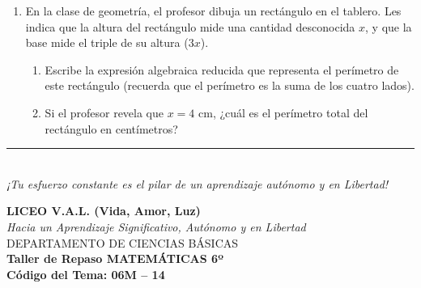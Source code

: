\documentclass[12pt, letterpaper]{article}
\begin{document}
\begin{enumerate}[itemsep=0.8cm]
		\item En la clase de geometría, el profesor dibuja un rectángulo en el tablero. Les indica que la altura del rectángulo mide una cantidad desconocida $x$, y que la base mide el triple de su altura ($3x$).
		\begin{enumerate}[label=\alph*., itemsep=0.2cm, topsep=0.2cm]
			\item Escribe la expresión algebraica reducida que representa el perímetro de este rectángulo (recuerda que el perímetro es la suma de los cuatro lados).
			\item Si el profesor revela que $x = 4\text{ cm}$, ¿cuál es el perímetro total del rectángulo en centímetros?
		\end{enumerate}
		
	\end{enumerate}
	
	\vfill
	\begin{center}
		\rule{0.5\textwidth}{0.4pt} \\
		\vspace{0.2cm}
		\textit{¡Tu esfuerzo constante es el pilar de un aprendizaje autónomo y en Libertad!}
	\end{center}
	
	\newpage
	\begin{center}
		{\Large \textbf{LICEO V.A.L. (Vida, Amor, Luz)}}\\[0.1cm]
		{\normalsize \textit{Hacia un Aprendizaje Significativo, Autónomo y en Libertad}}\\[0.2cm]
		{\large DEPARTAMENTO DE CIENCIAS BÁSICAS}\\[0.1cm]
		\textbf{Taller de Repaso MATEMÁTICAS 6º}\\[0.1cm]
		\textbf{Código del Tema: 06M – 14}\\[0.1cm]
	\end{center}
	
\end{document}
